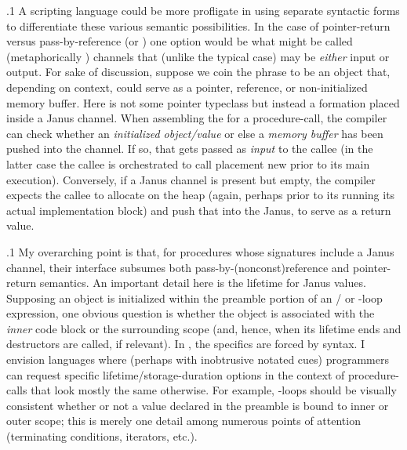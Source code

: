 \documentclass[11pt, twocolumn]{article}
\begin{document}
\p.1{%
A scripting language could be more profligate in using
separate syntactic forms to differentiate these various
semantic possibilities. In the case of pointer-return
versus pass-by-reference (or )
one option would be what might be called 
(metaphorically ) channels
that (unlike the typical case) may be \textit{either} input or output.
For sake of discussion, suppose we coin the phrase 
to be an object that, depending on context, could
serve as a pointer, reference, or non-initialized memory buffer.
Here  is not some pointer typeclass but
instead a formation placed inside a Janus channel.
When assembling the  for a procedure-call,
the compiler can check whether an \textit{initialized object/value}
or else a \textit{memory buffer} has been pushed into the channel.
If so, that gets passed as \textit{input} to the callee (in the
latter case the callee is orchestrated to call placement
new prior to its main execution). Conversely, if a Janus channel
is present but empty, the compiler expects the callee
to allocate on the heap (again, perhaps prior to its
running its actual implementation block) and push that
into the Janus, to serve as a return value.
}%

\p.1{%
My overarching point is that, for procedures whose signatures include
a Janus channel, their interface subsumes both pass-by-(nonconst)reference
and pointer-return semantics. An important detail here is the
lifetime for Janus values. Supposing an object is initialized
within the preamble portion of an / or -loop expression,
one obvious question is whether the object
is associated with the \textit{inner} code block or the surrounding scope
(and, hence, when its lifetime ends and destructors are
called, if relevant). In , the specifics are forced by
syntax. I envision languages where (perhaps with inobtrusive
notated cues) programmers can request specific lifetime/storage-duration
options in the context of procedure-calls that look mostly the
same otherwise. For example, -loops should
be visually consistent whether or not a value declared in the preamble
is bound to inner or outer scope; this is merely one detail
among numerous points of attention (terminating
conditions, iterators, etc.).
}%
\end{document}
